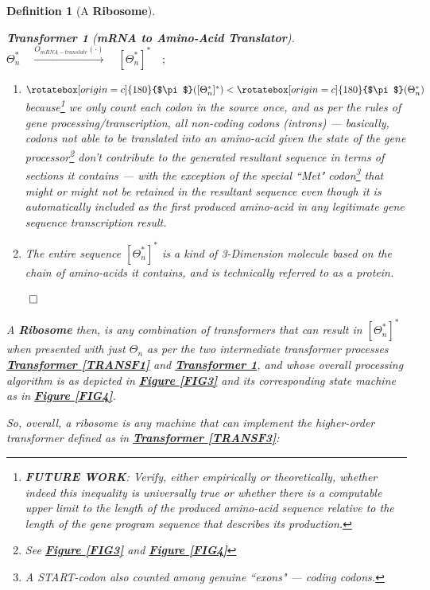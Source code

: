 \documentclass[a4paper, 18pt]{book} %
\newtheorem{defn}{Definition}
\newtheorem{transf}{Transformer}
\newcommand{\invpi}{\rotatebox[origin=c]{180}{$\pi$}}
\begin{document}
\begin{defn}[A \textbf{Ribosome}]
\vspace{1em}
\begin{transf}[\textbf{mRNA to Amino-Acid Translator}]
\label{TRANSF2}
$ $\\
$\Theta^*_n \quad \xrightarrow{O_{mRNA-translate}(\cdot)} \quad [\Theta^*_n]^* \quad;$\\
\begin{enumerate}
\item $\invpi([\Theta^*_n]^*) < \invpi(\Theta^*_n)$ because\footnote{\textbf{FUTURE WORK}: Verify, either empirically or theoretically, whether indeed this inequality is universally true or whether there is a computable upper limit to the length of the produced amino-acid sequence relative to the length of the gene program sequence that describes its production.} we only count each codon in the source once, and as per the rules of gene processing/transcription, all non-coding codons (introns) --- basically, codons not able to be translated into an amino-acid given the state of the gene processor\footnote{See \textbf{\hyperref[FIG3]{Figure \ref{FIG3}}} and \textbf{\hyperref[FIG4]{Figure \ref{FIG4}}}} don't contribute to the generated resultant sequence in terms of sections it contains --- with the exception of the special ``Met" codon\footnote{A START-codon also counted among genuine ``exons" --- coding codons.} that might or might not be retained in the resultant sequence even though it is automatically included as the first produced amino-acid in any legitimate gene sequence transcription result.
\item The entire sequence $[\Theta^*_n]^*$ is a kind of 3-Dimension molecule based on the chain of amino-acids it contains, and is technically referred to as a protein.
\end{enumerate}
$\qed$
\end{transf}
\vspace{2em}

A \textbf{Ribosome} then, is any combination of transformers that can result in $[\Theta^*_n]^*$ when presented with just $\Theta_n$ as per the two intermediate transformer processes \textbf{\hyperref[TRANSF1]{Transformer \ref{TRANSF1}}} and \textbf{\hyperref[TRANSF2]{Transformer \ref{TRANSF2}}}, and whose overall processing algorithm is as depicted in \textbf{\hyperref[FIG3]{Figure \ref{FIG3}}} and its corresponding state machine as in \textbf{\hyperref[FIG4]{Figure \ref{FIG4}}}. 

So, overall, a ribosome is any machine that can implement the higher-order transformer defined as in \textbf{\hyperref[TRANSF3]{Transformer \ref{TRANSF3}}}:


\end{defn}
\end{document}
